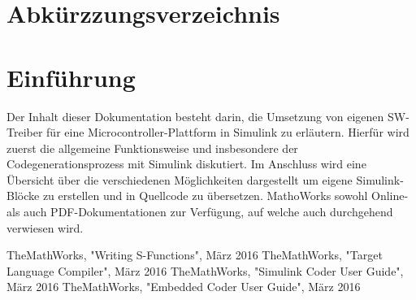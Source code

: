 \documentclass{article}
\begin{document}
\tableofcontents
\newpage
\section*{Abkürzzungsverzeichnis}
\begin{acronym}[Bash]
\end{acronym}

\newpage
\section{Einführung}
Der Inhalt dieser Dokumentation besteht darin, die Umsetzung von eigenen SW-Treiber für eine Microcontroller-Plattform in Simulink zu erläutern. Hierfür wird zuerst die allgemeine Funktionsweise und insbesondere der Codegenerationsprozess mit Simulink diskutiert. Im Anschluss wird eine Übersicht über die verschiedenen Möglichkeiten dargestellt um eigene Simulink-Blöcke zu erstellen und in Quellcode zu übersetzen. MathoWorks sowohl Online- als auch PDF-Dokumentationen zur Verfügung, auf welche auch durchgehend verwiesen wird.

\newpage


\newpage


\newpage
\renewcommand\refname{Literaturverzeichnis}
\begin{thebibliography}{}
	 TheMathWorks, "Writing S-Functions", März 2016
	 TheMathWorks, "Target Language Compiler", März 2016
	 TheMathWorks, "Simulink Coder User Guide", März 2016
	 TheMathWorks, "Embedded Coder User Guide", März 2016
\end{thebibliography}
\end{document}
